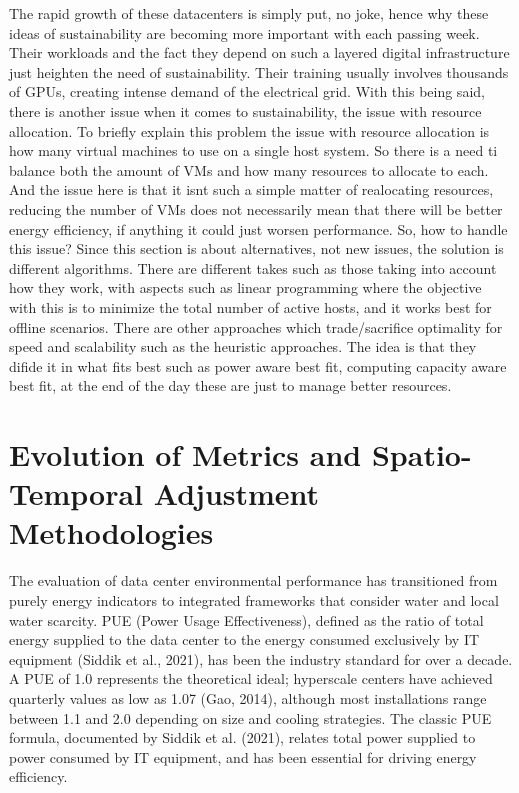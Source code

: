 \documentclass[conference]{IEEEtran}
\begin{document}
The rapid growth of these datacenters is simply put, no joke, hence why these ideas of sustainability are becoming more important with each passing week. Their workloads and the fact they depend on such a layered digital infrastructure just heighten the need of sustainability. Their training usually involves thousands of GPUs, creating intense demand of the electrical grid. With this being said, there is another issue when it comes to sustainability, the issue with resource allocation. To briefly explain this problem the issue with resource allocation is how many virtual machines to use on a single host system. So there is a need ti balance both the amount of VMs and how many resources to allocate to each. And the issue here is that it isnt such a simple matter of realocating resources, reducing the number of VMs does not necessarily mean that there will be  better energy efficiency, if anything it could just worsen performance. So, how to handle this issue? Since this section is about alternatives, not new issues, the solution is different algorithms. There are different takes such as those taking into account how they work, with aspects such as linear programming where the objective with this is to minimize the total number of active hosts, and it works best for offline scenarios. There are other approaches which trade/sacrifice optimality for speed and scalability such as the heuristic approaches. The idea is that they difide it in what fits best such as power aware best fit, computing capacity aware best fit, at the end of the day these are just to manage better resources.

\section{Evolution of Metrics and Spatio-Temporal Adjustment Methodologies}

The evaluation of data center environmental performance has transitioned from purely energy indicators to integrated frameworks that consider water and local water scarcity. PUE (Power Usage Effectiveness), defined as the ratio of total energy supplied to the data center to the energy consumed exclusively by IT equipment (Siddik et al., 2021), has been the industry standard for over a decade. A PUE of 1.0 represents the theoretical ideal; hyperscale centers have achieved quarterly values as low as 1.07 (Gao, 2014), although most installations range between 1.1 and 2.0 depending on size and cooling strategies. The classic PUE formula, documented by Siddik et al. (2021), relates total power supplied to power consumed by IT equipment, and has been essential for driving energy efficiency.
\end{document}
